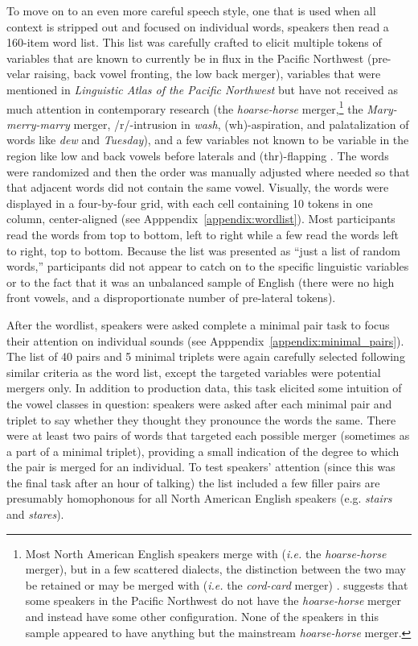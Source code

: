 To move on to an even more careful speech style, one that is used when all context is stripped out and focused on individual words, speakers then read a 160-item word list. This list was carefully crafted to elicit multiple tokens of variables that are known to currently be in flux in the Pacific Northwest (pre-velar raising, back vowel fronting, the low back merger), variables that were mentioned in \textit{Linguistic Atlas of the Pacific Northwest} but have not received as much attention in contemporary research (the \textit{hoarse-horse} merger,\footnote{Most North American English speakers merge \north with \force (\textit{i.e.} the \textit{hoarse-horse} merger), but in a few scattered dialects, the distinction between the two may be retained or \north may be merged with \start (\textit{i.e.} the \textit{cord-card} merger) \citep{labov_ash_boberg_2006_anae}. \citet[560]{reed_1961} suggests that some speakers in the Pacific Northwest do not have the \textit{hoarse-horse} merger and instead have some other configuration. None of the speakers in this sample appeared to have anything but the mainstream \textit{hoarse-horse} merger.} the \textit{Mary-merry-marry} merger, /r/-intrusion in \textit{wash}, (wh)-aspiration, and palatalization of words like \textit{dew} and \textit{Tuesday}), and a few variables not known to be variable in the region like low and back vowels before laterals \citep[cf.][]{stanley_2017_ADS} and (thr)-flapping \citep[cf.][]{stanley_2019_thr}. The words were randomized and then the order was manually adjusted where needed so that that adjacent words did not contain the same vowel. Visually, the words were displayed in a four-by-four grid, with each cell containing 10 tokens in one column, center-aligned (see Apppendix~\ref{appendix:wordlist}). Most participants read the words from top to bottom, left to right while a few read the words left to right, top to bottom. Because the list was presented as ``just a list of random words,'' participants did not appear to catch on to the specific linguistic variables or to the fact that it was an unbalanced sample of English (there were no high front vowels, and a disproportionate number of pre-lateral tokens).

After the wordlist, speakers were asked complete a minimal pair task to focus their attention on individual sounds (see Apppendix~\ref{appendix:minimal_pairs}). The list of 40 pairs and 5 minimal triplets were again carefully selected following similar criteria as the word list, except the targeted variables were potential mergers only. In addition to production data, this task elicited some intuition of the vowel classes in question: speakers were asked after each minimal pair and triplet to say whether they thought they pronounce the words the same. There were at least two pairs of words that targeted each possible merger (sometimes as a part of a minimal triplet), providing a small indication of the degree to which the pair is merged for an individual. To test speakers’ attention (since this was the final task after an hour of talking) the list included a few filler pairs are presumably homophonous for all North American English speakers (e.g. \textit{stairs} and \textit{stares}).

